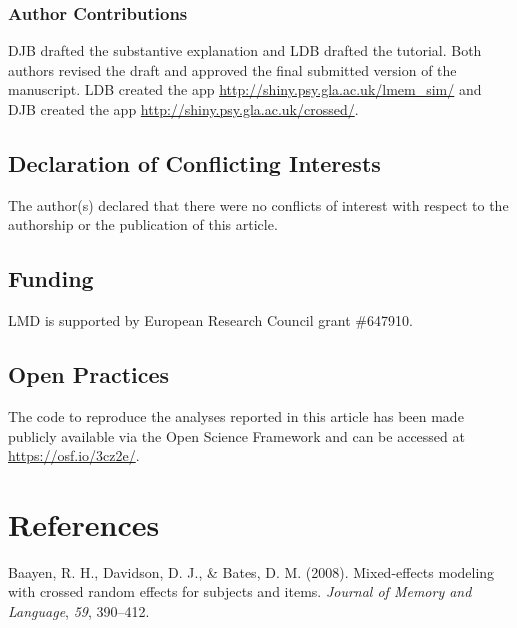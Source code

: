 \documentclass[doc,floatsintext]{apa6}
\begin{document}
\hypertarget{author-contributions}{%
\subsubsection{Author Contributions}\label{author-contributions}}

DJB drafted the substantive explanation and LDB drafted the tutorial. Both authors revised the draft and approved the final submitted version of the manuscript. LDB created the app \url{http://shiny.psy.gla.ac.uk/lmem_sim/} and DJB created the app \url{http://shiny.psy.gla.ac.uk/crossed/}.

\hypertarget{declaration-of-conflicting-interests}{%
\subsection{Declaration of Conflicting Interests}\label{declaration-of-conflicting-interests}}

The author(s) declared that there were no conflicts of interest with respect to the authorship or the publication of this article.

\hypertarget{funding}{%
\subsection{Funding}\label{funding}}

LMD is supported by European Research Council grant \#647910.

\hypertarget{open-practices}{%
\subsection{Open Practices}\label{open-practices}}

The code to reproduce the analyses reported in this article has been made publicly available via the Open Science Framework and can be accessed at \url{https://osf.io/3cz2e/}.

\newpage

\hypertarget{references}{%
\section{References}\label{references}}

\begingroup
\setlength{\parindent}{-0.5in}
\setlength{\leftskip}{0.5in}

\hypertarget{refs}{}
\leavevmode\hypertarget{ref-baayen_davidson_bates_2008}{}%
Baayen, R. H., Davidson, D. J., \& Bates, D. M. (2008). Mixed-effects modeling with crossed random effects for subjects and items. \emph{Journal of Memory and Language}, \emph{59}, 390--412.
\end{document}
